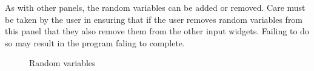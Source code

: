 As with other panels, the random variables can be added or removed. Care must be taken by the user in ensuring that if the user removes random variables from this panel that they also remove them from the other input widgets. Failing to do so may result in the program faling to complete.


\begin{figure}[!htbp]
  \caption{Random variables}
  \label{fig:figure11}
\end{figure}
